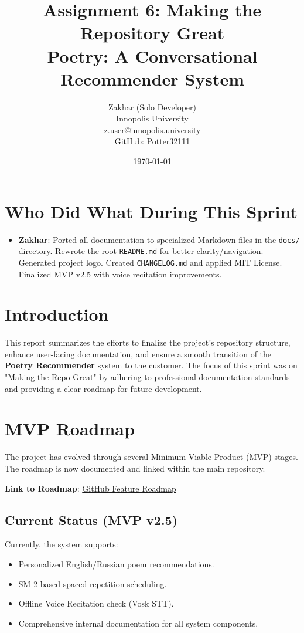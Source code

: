 \documentclass[12pt,a4paper]{article}
\title{Assignment 6: Making the Repository Great \\ \large Poetry: A Conversational Recommender System}
\author{Zakhar (Solo Developer) \\ Innopolis University \\ \href{mailto:z.user@innopolis.university}{z.user@innopolis.university} \\ GitHub: \href{https://github.com/Potter32111}{Potter32111}}
\date{\today}
\begin{document}
\maketitle

\section*{Who Did What During This Sprint}
\begin{itemize}
    \item \textbf{Zakhar}: Ported all documentation to specialized Markdown files in the \texttt{docs/} directory. Rewrote the root \texttt{README.md} for better clarity/navigation. Generated project logo. Created \texttt{CHANGELOG.md} and applied MIT License. Finalized MVP v2.5 with voice recitation improvements.
\end{itemize}

\newpage
\tableofcontents
\newpage

\section{Introduction}
This report summarizes the efforts to finalize the project's repository structure, enhance user-facing documentation, and ensure a smooth transition of the \textbf{Poetry Recommender} system to the customer. The focus of this sprint was on "Making the Repo Great" by adhering to professional documentation standards and providing a clear roadmap for future development.

\section{MVP Roadmap}
The project has evolved through several Minimum Viable Product (MVP) stages. The roadmap is now documented and linked within the main repository.

\textbf{Link to Roadmap}: \href{https://github.com/Potter32111/poetry-recommender#feature-roadmap}{GitHub Feature Roadmap}

\subsection{Current Status (MVP v2.5)}
Currently, the system supports:
\begin{itemize}
    \item Personalized English/Russian poem recommendations.
    \item SM-2 based spaced repetition scheduling.
    \item Offline Voice Recitation check (Vosk STT).
    \item Comprehensive internal documentation for all system components.
\end{itemize}
\end{document}
